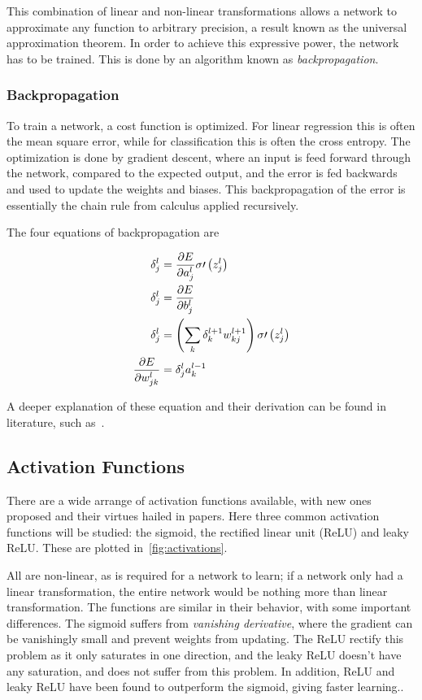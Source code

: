 This combination of linear and non-linear transformations allows a network to
approximate any function to arbitrary precision, a result known as the universal
approximation theorem\cite{mehta}. In order to achieve this expressive power,
the network has to be trained. This is done by an algorithm known as
\textit{backpropagation}.

\subsubsection{Backpropagation}

To train a network, a cost function is optimized. For linear regression this is
often the mean square error, while for classification this is often the cross
entropy. The optimization is done by gradient descent, where an input is feed
forward through the network, compared to the expected output, and the error is
fed backwards and used to update the weights and biases. This backpropagation of
the error is essentially the chain rule from calculus applied recursively.

The four equations of backpropagation are

\begin{align*}
  \delta_{j}^{l} &= \pdv{E}{a_{j}^{l}}\sigma\prime\left( z_{j}^{l} \right)\\
  \delta_{j}^{l} &= \pdv{E}{b_{j}^{l}}\\
  \delta_{j}^{l} &= \left( \sum_{k}\delta_{k}^{l+1}w_{kj}^{l+1} \right)\sigma\prime\left( z_{j}^{l} \right)\\
  \pdv{E}{w_{jk}^{l}} &= \delta_{j}^{l}a_{k}^{l-1}
\end{align*}

A deeper explanation of these equation and their derivation can be found in
literature, such as~\cite{mehta}.


\subsection{Activation Functions}

There are a wide arrange of activation functions available, with new ones
proposed and their virtues hailed in papers. Here three common activation
functions will be studied: the sigmoid, the rectified linear unit (ReLU) and
leaky ReLU. These are plotted in~\cref{fig:activations}.

All are non-linear, as is required for a network to learn; if a network only had
a linear transformation, the entire network would be nothing more than linear
transformation. The functions are similar in their behavior, with some important
differences. The sigmoid suffers from \textit{vanishing derivative}, where the
gradient can be vanishingly small and prevent weights from updating. The ReLU
rectify this problem as it only saturates in one direction, and the leaky ReLU
doesn't have any saturation, and does not suffer from this problem. In addition,
ReLU and leaky ReLU have been found to outperform the sigmoid, giving faster learning.\cite{mehta}\cite{statelem}.

